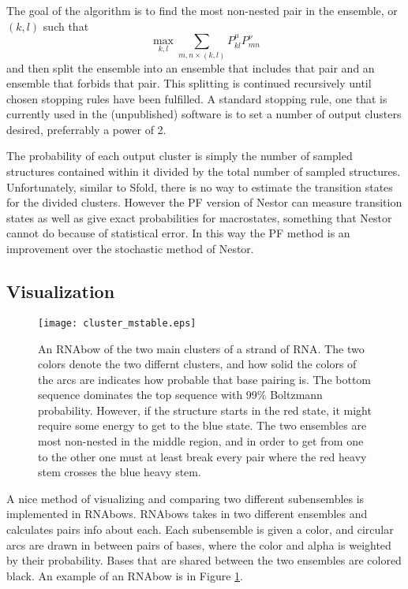 The goal of the algorithm is to find the most non-nested pair in the
ensemble, or $(k,l)$ such that
\begin{equation}
\max_{k,l} \sum_{m,n \times (k,l)} P^\mu_{kl}P^\nu_{mn}
\end{equation}
and then split the ensemble into an ensemble that includes
that pair and an ensemble that forbids that pair. This splitting is
continued recursively until chosen stopping rules have been
fulfilled. A standard stopping rule, one that is currently used in the
(unpublished) software is to set a number of output clusters desired,
preferrably a power of 2. 

The probability of each output cluster is simply the number of sampled
structures contained within it divided by the total number of sampled
structures. Unfortunately, similar to Sfold, there is no way to
estimate the transition states for the divided clusters. However the
PF version of Nestor can measure transition states as well as give
exact probabilities for macrostates, something that Nestor cannot do
because of statistical error. In this way the PF method is an
improvement over the stochastic method of Nestor.

\subsection{Visualization}
\begin{figure}[t]
\texttt{[image: cluster\_mstable.eps]}
\caption{An RNAbow of the two main clusters of a strand of RNA. The
  two colors denote the two differnt clusters, and how solid the
  colors of the arcs are indicates how probable that base pairing
  is. The bottom sequence dominates the top sequence with 99\%
  Boltzmann probability. However, if the structure starts in the red
  state, it might require some energy to get to the blue state. The
  two ensembles are most non-nested in the middle region, and in order
  to get from one to the other one must at least break every pair
  where the red heavy stem crosses the blue heavy stem.}
\label{fig:rnaBow}
\end{figure}

A nice method of visualizing and comparing two different subensembles
is implemented in RNAbows. RNAbows takes in two different ensembles
and calculates pairs info about each. Each subensemble is given a
color, and circular arcs are drawn in between pairs of bases, where
the color and alpha is weighted by their probability. Bases that are
shared between the two ensembles are colored black. An example of an
RNAbow is in Figure \ref{fig:rnaBow}.

